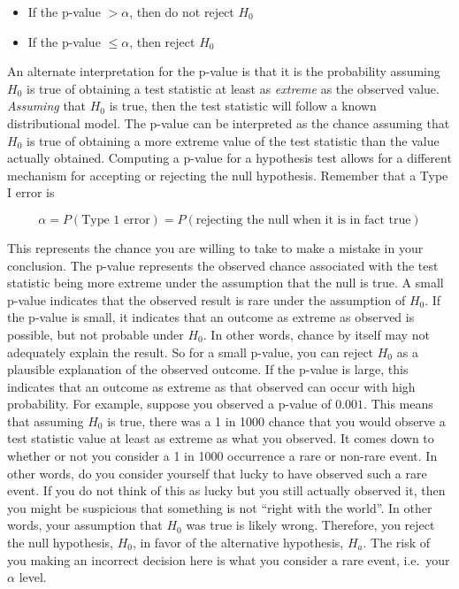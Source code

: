 \documentclass[
]{book}
\theoremstyle{definition}
\theoremstyle{definition}
\theoremstyle{definition}
\theoremstyle{definition}
\theoremstyle{remark}
\begin{document}
\begin{itemize}
\item
  If the p-value \(> \alpha\), then do not reject \(H_{0}\)
\item
  If the p-value \(\leq \alpha\), then reject \(H_{0}\)
\end{itemize}

An alternate interpretation for the p-value is that it is the
probability assuming \(H_{0}\) is true of obtaining a test statistic at
least as \emph{extreme} as the observed value. \emph{Assuming} that \(H_{0}\) is
true, then the test statistic will follow a known distributional model.
The p-value can be interpreted as the chance assuming that \(H_{0}\) is
true of obtaining a more extreme value of the test statistic than the
value actually obtained. Computing a p-value for a hypothesis test
allows for a different mechanism for accepting or rejecting the null
hypothesis. Remember that a Type I error is

\[\alpha = P(\text{Type 1 error}) = P(\text{rejecting the null when it is in fact true})\]

This represents the chance you are willing to take to make a mistake in
your conclusion. The p-value represents the observed chance associated
with the test statistic being more extreme under the assumption that the
null is true. A small p-value indicates that the observed result is rare
under the assumption of \(H_{0}\). If the p-value is small, it indicates
that an outcome as extreme as observed is possible, but not probable
under \(H_{0}\). In other words, chance by itself may not adequately
explain the result. So for a small p-value, you can reject \(H_{0}\) as a
plausible explanation of the observed outcome. If the p-value is large,
this indicates that an outcome as extreme as that observed can occur
with high probability. For example, suppose you observed a p-value of
\(0.001\). This means that assuming \(H_{0}\) is true, there was a 1 in 1000
chance that you would observe a test statistic value at least as extreme
as what you observed. It comes down to whether or not you consider a 1
in 1000 occurrence a rare or non-rare event. In other words, do you
consider yourself that lucky to have observed such a rare event. If you
do not think of this as lucky but you still actually observed it, then
you might be suspicious that something is not ``right with the world''. In
other words, your assumption that \(H_{0}\) was true is likely wrong.
Therefore, you reject the null hypothesis, \(H_{0}\), in favor of the
alternative hypothesis, \(H_{a}\). The risk of you making an incorrect
decision here is what you consider a rare event, i.e.~your \(\alpha\)
level.
\end{document}
